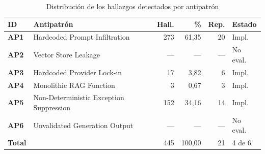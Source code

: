 \begin{table}[t]
\centering
\scriptsize
\setlength{\tabcolsep}{3pt}
\caption{Distribución de los hallazgos detectados por antipatrón}
\label{tab:distribucion}
\begin{tabularx}{\columnwidth}{@{}l >{\raggedright\arraybackslash}X r r r l@{}}
\toprule
\textbf{ID} & \textbf{Antipatrón} & \textbf{Hall.} & \textbf{\%} & \textbf{Rep.} & \textbf{Estado} \\
\midrule
\textbf{AP1} & Hardcoded Prompt Infiltration & 273 & 61,35 & 20 & Impl. \\
\textbf{AP2} & Vector Store Leakage & --- & --- & --- & No eval. \\
\textbf{AP3} & Hardcoded Provider Lock-in & 17 & 3,82 & 6 & Impl. \\
\textbf{AP4} & Monolithic RAG Function & 3 & 0,67 & 3 & Impl. \\
\textbf{AP5} & Non-Deterministic Exception Suppression & 152 & 34,16 & 14 & Impl. \\
\textbf{AP6} & Unvalidated Generation Output & --- & --- & --- & No eval. \\
\midrule
\textbf{Total} & & 445 & 100,00 & 21 & 4 de 6 \\
\bottomrule
\end{tabularx}
\end{table}